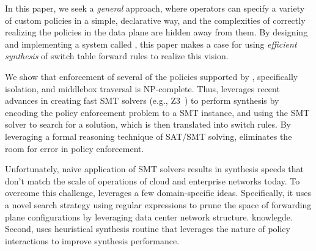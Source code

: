 In this paper, we seek a {\em general} approach, where operators can
specify a variety of custom policies in a simple, declarative way, and
the complexities of correctly realizing the policies in the data plane
are hidden away from them. %
By designing and implementing a system called \Name, this paper makes
a case for using \emph{efficient synthesis} of switch table forward
rules to realize this vision.

We show that enforcement of several of the policies supported by
\Name, specifically isolation, and middlebox traversal is
NP-complete. Thus, \Name leverages recent advances in creating fast
SMT solvers (e.g., Z3~\cite{z3}) to perform synthesis by encoding the
policy enforcement problem to a SMT instance, and using the SMT solver
to search for a solution, which is then translated into switch
rules. %
By leveraging a formal reasoning technique of SAT/SMT solving, \Name
eliminates the room for error in policy enforcement.

Unfortunately, naive application of SMT solvers results in synthesis
speeds that don't match the scale of operations of cloud and
enterprise networks today.  To overcome this challenge, \Name leverages a few
domain-specific ideas.  Specifically, it uses a novel search strategy
using regular expressions to prune the space of forwarding plane
configurations by leveraging data center network
structure.  knowlegde. Second,
\Name uses heuristical synthesis routine that leverages the nature of
policy interactions to improve synthesis performance. 


